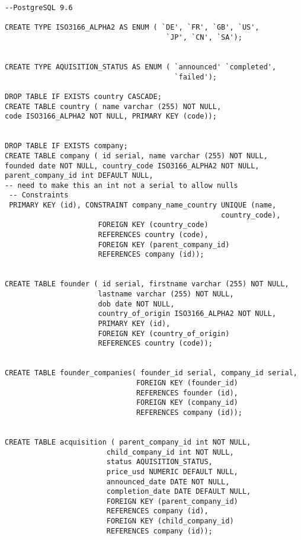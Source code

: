 \documentclass[12pt]{article}
\begin{document}
\begin{verbatim}
--PostgreSQL 9.6

CREATE TYPE ISO3166_ALPHA2 AS ENUM ( `DE', `FR', `GB', `US',
                                      `JP', `CN', `SA');


CREATE TYPE AQUISITION_STATUS AS ENUM ( `announced' `completed',
                                        `failed');

DROP TABLE IF EXISTS country CASCADE;
CREATE TABLE country ( name varchar (255) NOT NULL,
code ISO3166_ALPHA2 NOT NULL, PRIMARY KEY (code));


DROP TABLE IF EXISTS company;
CREATE TABLE company ( id serial, name varchar (255) NOT NULL,
founded date NOT NULL, country_code ISO3166_ALPHA2 NOT NULL,
parent_company_id int DEFAULT NULL,
-- need to make this an int not a serial to allow nulls
 -- Constraints
 PRIMARY KEY (id), CONSTRAINT company_name_country UNIQUE (name,
                                                   country_code),
                      FOREIGN KEY (country_code)
                      REFERENCES country (code),
                      FOREIGN KEY (parent_company_id)
                      REFERENCES company (id));


CREATE TABLE founder ( id serial, firstname varchar (255) NOT NULL,
                      lastname varchar (255) NOT NULL,
                      dob date NOT NULL,
                      country_of_origin ISO3166_ALPHA2 NOT NULL,
                      PRIMARY KEY (id),
                      FOREIGN KEY (country_of_origin)
                      REFERENCES country (code));


CREATE TABLE founder_companies( founder_id serial, company_id serial,
                               FOREIGN KEY (founder_id)
                               REFERENCES founder (id),
                               FOREIGN KEY (company_id)
                               REFERENCES company (id));


CREATE TABLE acquisition ( parent_company_id int NOT NULL,
                        child_company_id int NOT NULL,
                        status AQUISITION_STATUS,
                        price_usd NUMERIC DEFAULT NULL,
                        announced_date DATE NOT NULL,
                        completion_date DATE DEFAULT NULL,
                        FOREIGN KEY (parent_company_id)
                        REFERENCES company (id),
                        FOREIGN KEY (child_company_id)
                        REFERENCES company (id));

\end{verbatim}
\end{document}
